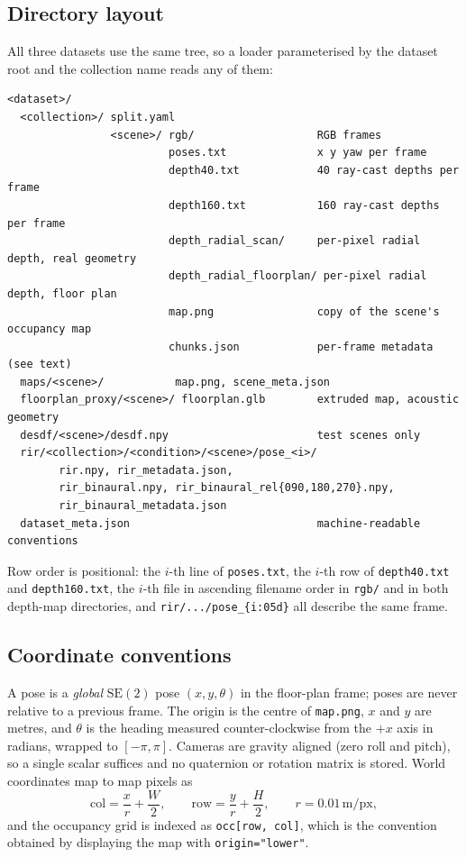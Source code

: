 \subsection{Directory layout}
\label{sec:supp-layout}

All three datasets use the same tree, so a loader parameterised by the dataset
root and the collection name reads any of them:

\begin{verbatim}
<dataset>/
  <collection>/ split.yaml
                <scene>/ rgb/                   RGB frames
                         poses.txt              x y yaw per frame
                         depth40.txt            40 ray-cast depths per frame
                         depth160.txt           160 ray-cast depths per frame
                         depth_radial_scan/     per-pixel radial depth, real geometry
                         depth_radial_floorplan/ per-pixel radial depth, floor plan
                         map.png                copy of the scene's occupancy map
                         chunks.json            per-frame metadata (see text)
  maps/<scene>/           map.png, scene_meta.json
  floorplan_proxy/<scene>/ floorplan.glb        extruded map, acoustic geometry
  desdf/<scene>/desdf.npy                       test scenes only
  rir/<collection>/<condition>/<scene>/pose_<i>/
        rir.npy, rir_metadata.json,
        rir_binaural.npy, rir_binaural_rel{090,180,270}.npy,
        rir_binaural_metadata.json
  dataset_meta.json                             machine-readable conventions
\end{verbatim}

Row order is positional: the $i$-th line of \texttt{poses.txt}, the $i$-th row of
\texttt{depth40.txt} and \texttt{depth160.txt}, the $i$-th file in ascending
filename order in \texttt{rgb/} and in both depth-map directories, and
\texttt{rir/.../pose\_\{i:05d\}} all describe the same frame.

\subsection{Coordinate conventions}
\label{sec:supp-coords}

A pose is a \emph{global} $\mathrm{SE}(2)$ pose $(x, y, \theta)$ in the floor-plan
frame; poses are never relative to a previous frame. The origin is the centre of
\texttt{map.png}, $x$ and $y$ are metres, and $\theta$ is the heading measured
counter-clockwise from the $+x$ axis in radians, wrapped to $[-\pi, \pi]$.
Cameras are gravity aligned (zero roll and pitch), so a single scalar suffices
and no quaternion or rotation matrix is stored. World coordinates map to map
pixels as
\begin{equation}
  \mathrm{col} = \frac{x}{r} + \frac{W}{2}, \qquad
  \mathrm{row} = \frac{y}{r} + \frac{H}{2}, \qquad r = 0.01\,\mathrm{m/px},
\end{equation}
and the occupancy grid is indexed as \texttt{occ[row, col]}, which is the
convention obtained by displaying the map with \texttt{origin="lower"}.

